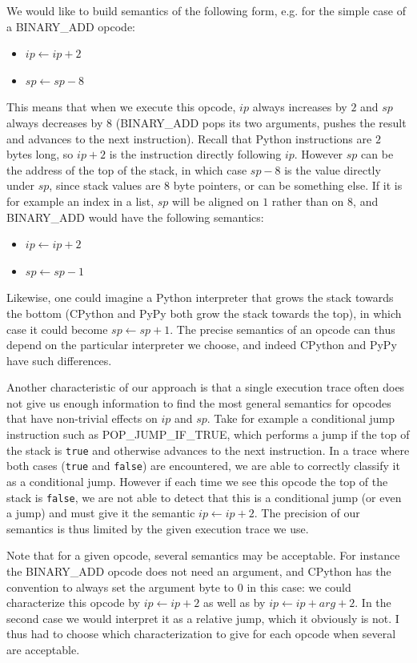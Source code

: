 \documentclass[english]{article}
\begin{document}
We would like to build semantics of the following form, e.g. for the simple case of a BINARY\_ADD opcode:
\begin{itemize}
	\item $ip \leftarrow ip + 2$
	\item $sp \leftarrow sp - 8$
\end{itemize}
This means that when we execute this opcode, $ip$ always increases by $2$ and $sp$ always decreases by $8$ (BINARY\_ADD pops its two arguments, pushes the result and advances to the next instruction). Recall that Python instructions are $2$ bytes long, so $ip + 2$ is the instruction directly following $ip$. However $sp$ can be the address of the top of the stack, in which case $sp - 8$ is the value directly under $sp$, since stack values are $8$ byte pointers, or can be something else. If it is for example an index in a list, $sp$ will be aligned on $1$ rather than on $8$, and BINARY\_ADD would have the following semantics:
\begin{itemize}
	\item $ip \leftarrow ip + 2$
	\item $sp \leftarrow sp - 1$
\end{itemize}
Likewise, one could imagine a Python interpreter that grows the stack towards the bottom (CPython and PyPy both grow the stack towards the top), in which case it could become $sp \leftarrow sp + 1$. The precise semantics of an opcode can thus depend on the particular interpreter we choose, and indeed CPython and PyPy have such differences.

Another characteristic of our approach is that a single execution trace often does not give us enough information to find the most general semantics for opcodes that have non-trivial effects on $ip$ and $sp$. Take for example a conditional jump instruction such as POP\_JUMP\_IF\_TRUE, which performs a jump if the top of the stack is \texttt{true} and otherwise advances to the next instruction. In a trace where both cases (\texttt{true} and \texttt{false}) are encountered, we are able to correctly classify it as a conditional jump. However if each time we see this opcode the top of the stack is \texttt{false}, we are not able to detect that this is a conditional jump (or even a jump) and must give it the semantic $ip \leftarrow ip + 2$. The precision of our semantics is thus limited by the given execution trace we use.

Note that for a given opcode, several semantics may be acceptable. For instance the BINARY\_ADD opcode does not need an argument, and CPython has the convention to always set the argument byte to $0$ in this case: we could characterize this opcode by $ip \leftarrow ip + 2$ as well as by $ip \leftarrow ip + arg + 2$. In the second case we would interpret it as a relative jump, which it obviously is not. I thus had to choose which characterization to give for each opcode when several are acceptable.
\end{document}
